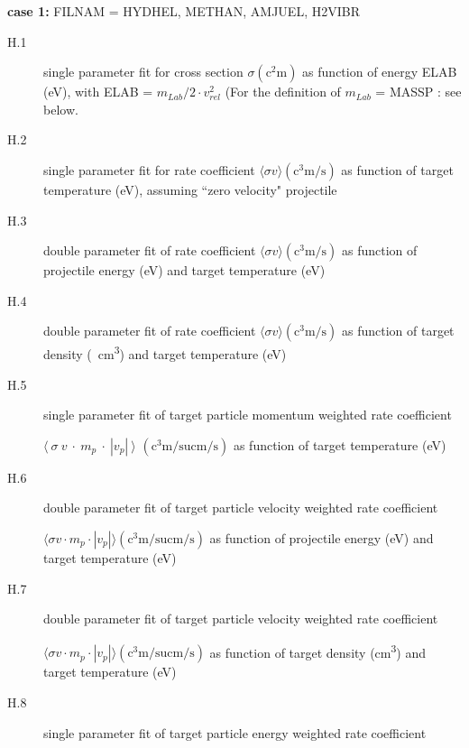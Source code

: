 \begin{description}
        \textbf{case 1:} FILNAM = HYDHEL, METHAN,  AMJUEL, H2VIBR
        \begin{description}
          \item[H.1] single parameter fit for cross section $\sigma
                  (\si{\square\centi\metre})$ as function of energy ELAB (\si{\electronvolt}),
                with ELAB = $m_{Lab} / 2  \cdot  v_{rel}^2 $ (For the definition of $m_{Lab}$ =
                MASSP : see below.
          \item[H.2] single parameter fit for rate coefficient $\langle \sigma v \rangle
                  (\si{\cubic\centi\metre\per\second})$ as function of target temperature
                (\si{\electronvolt}), assuming ``zero velocity" projectile
          \item[H.3] double
                parameter fit of rate coefficient $\langle \sigma v
                  \rangle(\si{\cubic\centi\metre\per\second})$ as function of projectile energy
                (\si{\electronvolt}) and target temperature (\si{\electronvolt})
          \item[H.4]
                double parameter fit of rate coefficient $\langle \sigma v \rangle
                  (\si{\cubic\centi\metre\per\second})$ as function of target density
                (\si{\per\cubic\centi\metre}) and target temperature (\si{\electronvolt})
          \item[H.5] single parameter fit of target particle momentum weighted rate
                coefficient 

                $\langle~\sigma~v~\cdot~m_p~\cdot~|v_p|~\rangle$ $
                  (\si{\cubic\centi\metre\per\second\atomicmassunit\centi\metre\per\second})$ as
                function of target temperature (\si{\electronvolt})
          \item[H.6] double parameter
                fit of target particle velocity weighted rate coefficient 

                $\langle \sigma v  \cdot  m_p  \cdot  | v_p | \rangle
                  (\si{\cubic\centi\metre\per\second\atomicmassunit\centi\metre\per\second})$ as
                function of projectile energy (\si{\electronvolt}) and target temperature
                (\si{\electronvolt})
          \item[H.7] double parameter fit of target particle
                velocity weighted rate coefficient 

                $\langle \sigma v \cdot m_p \cdot | v_p | \rangle
                  (\si{\cubic\centi\metre\per\second\atomicmassunit\centi\metre\per\second})$ as
                function of target density (\si{\cubic\centi\metre}) and target temperature
                (\si{\electronvolt})
          \item[H.8] single parameter fit of target particle energy
                weighted rate coefficient 


\end{description}
\end{description}

